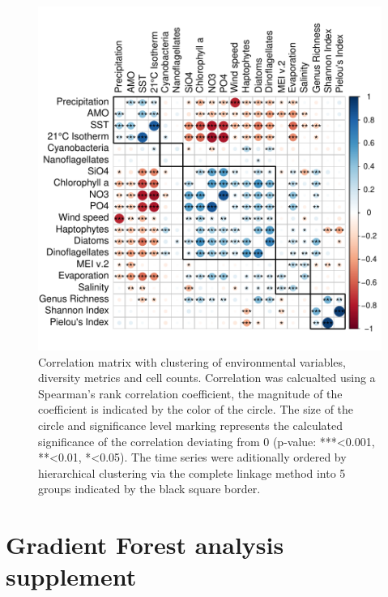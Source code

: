 \documentclass[draft]{agujournal2019}
\begin{document}
\begin{figure}
\noindent\includegraphics[width=\textwidth]{fig/CorrClustSupplementalPlot_v1.pdf}
\caption{Correlation matrix with clustering of environmental variables, diversity metrics and cell counts. Correlation was calcualted using a Spearman's rank correlation coefficient, the magnitude of the coefficient is indicated by the color of the circle. The size of the circle and significance level marking represents the calculated significance of the correlation deviating from 0 (p-value: ***\textless0.001, **\textless0.01, *\textless0.05). The time series were aditionally ordered by hierarchical clustering via the complete linkage method into 5 groups indicated by the black square border.}
\label{fig:sup:correlation}
\end{figure}



\section{Gradient Forest analysis supplement}
\end{document}
